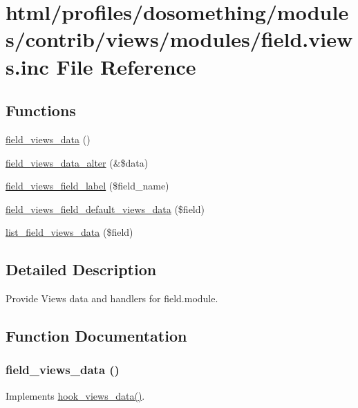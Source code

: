 \hypertarget{field_8views_8inc}{
\section{html/profiles/dosomething/modules/contrib/views/modules/field.views.inc File Reference}
\label{field_8views_8inc}
}
\subsection*{Functions}
\begin{DoxyCompactItemize}
\item 
\hyperlink{field_8views_8inc_ad5dcedc92c92554f7a7fa83805b58026}{field\_\-views\_\-data} ()
\item 
\hyperlink{field_8views_8inc_a08484225a12bde8e9e4a23c519ff4fd8}{field\_\-views\_\-data\_\-alter} (\&\$data)
\item 
\hyperlink{field_8views_8inc_a37ebb9b2c6dcf5c93062f4f96c6c1f0f}{field\_\-views\_\-field\_\-label} (\$field\_\-name)
\item 
\hyperlink{field_8views_8inc_adbb71dc4cb1642151e243f305ba34223}{field\_\-views\_\-field\_\-default\_\-views\_\-data} (\$field)
\item 
\hyperlink{field_8views_8inc_afb67c64115540e28d7e1b8ddaa3a5569}{list\_\-field\_\-views\_\-data} (\$field)
\end{DoxyCompactItemize}


\subsection{Detailed Description}
Provide Views data and handlers for field.module. 

\subsection{Function Documentation}
\hypertarget{field_8views_8inc_ad5dcedc92c92554f7a7fa83805b58026}{
\subsubsection[{field\_\-views\_\-data}]{\setlength{\rightskip}{0pt plus 5cm}field\_\-views\_\-data ()}}
\label{field_8views_8inc_ad5dcedc92c92554f7a7fa83805b58026}
Implements \hyperlink{group__views__hooks_ga227057901681e4a33e33c199c7a8c989}{hook\_\-views\_\-data()}.

